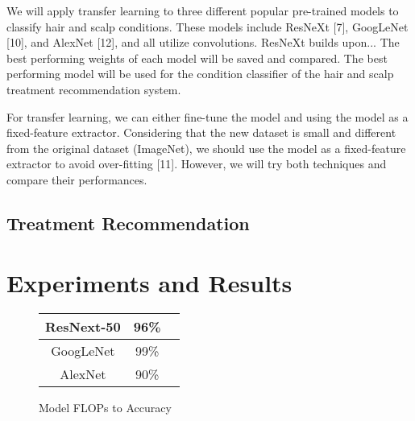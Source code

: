\documentclass[10pt,twocolumn,letterpaper]{article}
\begin{document}
We will apply transfer learning to three different popular pre-trained models to classify hair and scalp conditions. These models include ResNeXt [7], GoogLeNet [10], and AlexNet [12], and all utilize convolutions. ResNeXt builds upon... The best performing weights of each model will be saved and compared. The best performing model will be used for the condition classifier of the hair and scalp treatment recommendation system.

For transfer learning, we can either fine-tune the model and using the model as a fixed-feature extractor. Considering that the new dataset is small and different from the original dataset (ImageNet), we should use the model as a fixed-feature extractor to avoid over-fitting [11]. However, we will try both techniques and compare their performances.

\subsection{Treatment Recommendation}

\section{Experiments and Results}

\begin{figure}[H]
\centering
\begin{tabular}{ |c|c|c| }
\hline
 ResNext-50 & 96\% \\
\hline
 GoogLeNet & 99\% \\
\hline
 AlexNet & 90\% \\
\hline
\end{tabular}
\end{figure}

\begin{figure}[H]
\caption{Model FLOPs to Accuracy}
\end{figure}
\end{document}
